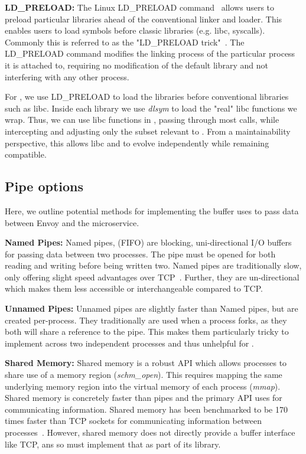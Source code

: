 \textbf{LD\_PRELOAD:}
The Linux LD\_PRELOAD command~\cite{ldpreload} allows users to preload particular libraries ahead of the conventional linker and loader.
This enables users to load symbols before classic libraries (e.g. libc, syscalls).
Commonly this is referred to as the "LD\_PRELOAD trick"~\cite{ldtrick}.
The LD\_PRELOAD command modifies the linking process of the particular process it is attached to, requiring no modification of the default library and not interfering with any other process.


For \sysname, we use LD\_PRELOAD to load the \sysname libraries before conventional libraries such as libc.
Inside each \sysname library we use \textit{dlsym} to load the "real" libc functions we wrap.
Thus, we can use libc functions in \sysname, passing through most calls, while intercepting and adjusting only the subset relevant to \sysname.
From a maintainability perspective, this allows libc and \sysname to evolve independently while remaining compatible.

\subsection{Pipe options}
Here, we outline potential methods for implementing the buffer \sysname uses to pass data between Envoy and the microservice.

\textbf{Named Pipes:}
Named pipes, (FIFO) are blocking, uni-directional I/O buffers for passing data between two processes.
The pipe must be opened for both reading and writing before being written two.
Named pipes are traditionally slow, only offering slight speed advantages over TCP~\cite{ipcperf}.
Further, they are un-directional which makes them less accessible or interchangeable compared to TCP.

\textbf{Unnamed Pipes:}
Unnamed pipes are slightly faster than Named pipes, but are created per-process.
They traditionally are used when a process forks, as they both will share a reference to the pipe.
This makes them particularly tricky to implement across two independent processes and thus unhelpful for \sysname.

\textbf{Shared Memory:}
Shared memory is a robust API which allows processes to share use of a memory region (\textit{schm\_open}).
This requires mapping the same underlying memory region into the virtual memory of each process (\textit{mmap}).
Shared memory is concretely faster than pipes and the primary API \sysname uses for communicating information.
Shared memory has been benchmarked to be 170 times faster than TCP sockets for communicating information between processes~\cite{ipcperf}.
However, shared memory does not directly provide a buffer interface like TCP, ans so \sysname must implement that as part of its library.


